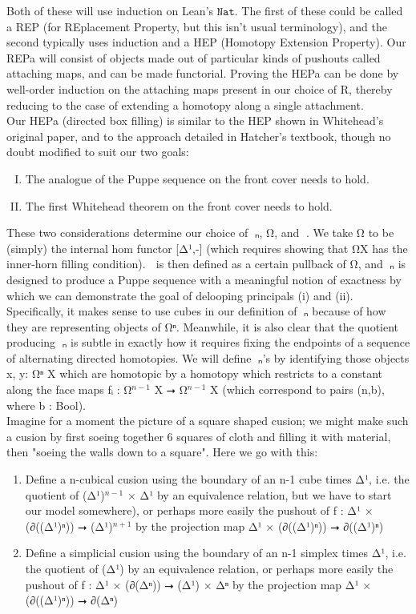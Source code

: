 \documentclass{book}
\theoremstyle{definition}
\begin{document}
Both of these will use induction on Lean's $\texttt{Nat}$. The first of these could be called a REP (for REplacement Property, but this isn't usual terminology), and the second typically uses induction and a HEP (Homotopy Extension Property). Our REPa will consist of objects made out of particular kinds of pushouts called attaching maps, and can be made functorial. Proving the HEPa can be done by well-order induction on the attaching maps present in our choice of R, thereby reducing to the case of extending a homotopy along a single attachment.\\

Our HEPa (directed box filling) is similar to the HEP shown in Whitehead's original paper, and to the approach detailed in Hatcher's textbook, though no doubt modified to suit our two goals:

\begin{enumerate}[(I)]
\item The analogue of the Puppe sequence on the front cover needs to hold.
\item The first Whitehead theorem on the front cover needs to hold.
\end{enumerate}

These two considerations determine our choice of π⃗ₙ, Ω⃗, and ω⃗. We take Ω⃗ to be (simply) the internal hom functor [Δ¹,-] (which requires showing that Ω⃗X has the inner-horn filling condition). ω⃗ is then defined as a certain pullback of Ω⃗, and π⃗ₙ is designed to produce a Puppe sequence with a meaningful notion of exactness by which we can demonstrate the goal of delooping principals (i) and (ii). Specifically, it makes sense to use cubes in our definition of π⃗ₙ because of how they are representing objects of Ω⃗ⁿ. Meanwhile, it is also clear that the quotient producing π⃗ₙ is subtle in exactly how it requires fixing the endpoints of a sequence of alternating directed homotopies. We will define π⃗ₙ's by identifying those objects x, y: Ω⃗ⁿ X which are homotopic by a homotopy which restricts to a constant along the face maps fᵢ : Ω⃗${}^{n-1}$ X ⭢ Ω⃗${}^{n-1}$ X (which correspond to pairs (n,b), where b : Bool).\\

Imagine for a moment the picture of a square shaped cusion; we might make such a cusion by first soeing together 6 squares of cloth and filling it with material, then "soeing the walls down to a square". Here we go with this:

\begin{enumerate}
\item Define a n-cubical cusion using the boundary of an n-1 cube times Δ¹, i.e. the quotient of (Δ¹)${}^{n-1}$ × Δ¹ by an equivalence relation, but we have to start our model somewhere), or perhaps more easily the pushout of f : Δ¹ × (∂((Δ¹)ⁿ)) ⭢ (Δ¹)${}^{n+1}$ by the projection map Δ¹ × (∂((Δ¹)ⁿ)) ⭢ ∂((Δ¹)ⁿ)
\item Define a simplicial cusion using the boundary of an n-1 simplex times Δ¹, i.e. the quotient of (Δ¹) by an equivalence relation, or perhaps more easily the pushout of f : Δ¹ × (∂(Δⁿ)) ⭢ (Δ¹) × Δⁿ by the projection map Δ¹ × (∂((Δ¹)ⁿ)) ⭢ ∂(Δⁿ)
\end{enumerate}
\end{document}
